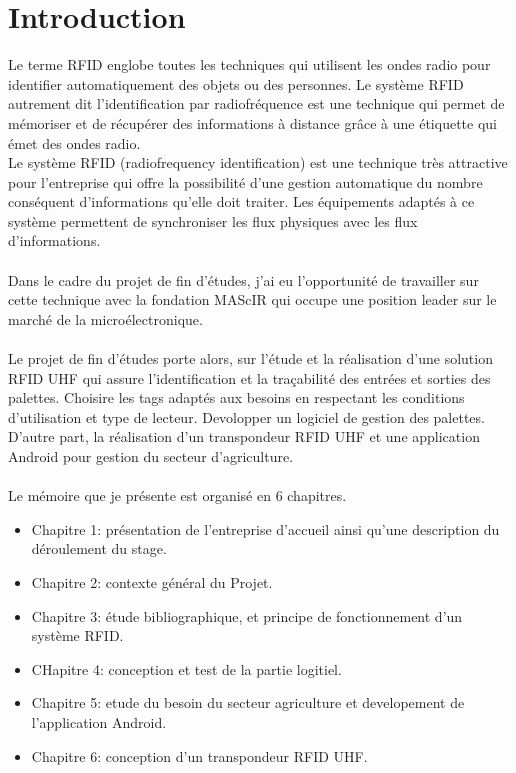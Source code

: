 \documentclass[11pt, a4paper, twoside]{book}
\begin{document}
\listoffigures

\listoftables

\chapter*{Introduction}
Le terme RFID englobe toutes les techniques qui utilisent les ondes radio pour identifier automatiquement des objets ou des personnes.
Le système RFID autrement dit l'identification par radiofréquence est une technique qui permet de mémoriser et de récupérer des informations à distance grâce à une étiquette qui émet des ondes radio.\\
Le système RFID (radiofrequency identification) est une technique très attractive pour l'entreprise qui offre la possibilité d'une gestion automatique du nombre conséquent d'informations qu'elle doit traiter. Les équipements adaptés à ce système permettent de synchroniser les flux physiques avec les flux d'informations.\\\\
Dans le cadre du projet de fin d'études, j'ai eu l'opportunité de travailler sur cette technique avec la fondation MAScIR qui occupe une position leader sur le marché de la microélectronique.\\\\
Le projet de fin d’études porte alors, sur l'étude et la réalisation d’une solution RFID UHF qui assure l’identification et la traçabilité des entrées et sorties des palettes. Choisire les tags adaptés aux besoins en respectant les conditions d’utilisation et type de lecteur. Devolopper un logiciel de gestion des palettes. D’autre part, la réalisation d’un transpondeur RFID UHF et une application Android pour gestion du secteur d'agriculture.\\\\
Le mémoire que je présente est organisé en 6 chapitres.

\begin{itemize}
\item Chapitre 1: présentation de l'entreprise d'accueil ainsi qu'une description du déroulement du stage.
\item Chapitre 2: contexte général du Projet.
\item Chapitre 3: étude bibliographique, et principe de fonctionnement d’un système RFID. 
\item CHapitre 4: conception et test de la partie logitiel.
\item Chapitre 5: etude du besoin du secteur agriculture et developement de l'application Android.
\item Chapitre 6: conception d'un transpondeur RFID UHF.
\end{itemize}
\end{document}

